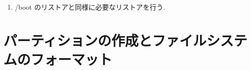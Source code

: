 \documentclass{jarticle}
\begin{document}
\begin{enumerate}
\item /boot のリストアと同様に必要なリストアを行う.
%
%
%
%
%
%
%
%
%
\end{enumerate}

\appendix

\section{パーティションの作成とファイルシステムのフォーマット \label{sec:mkprttn-frmt}}
\end{document}
